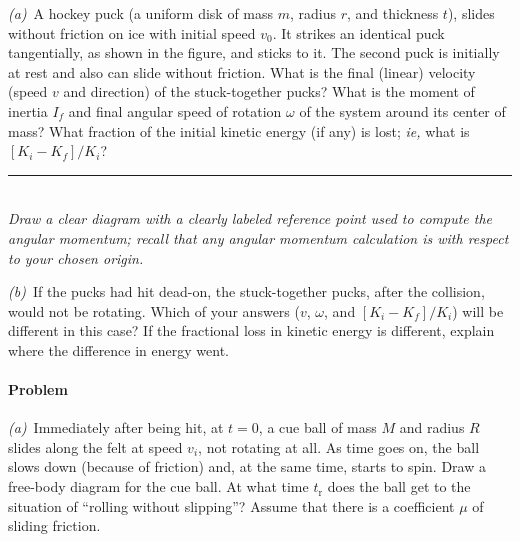 \documentclass[12pt]{article}
\newcounter{problem}
\begin{document}
\textsl{(a)}~A hockey puck (a uniform disk of mass $m$, radius $r$,
and thickness $t$), slides without friction on ice with initial speed
$v_0$.  It strikes an identical puck tangentially, as shown in the
figure, and sticks to it.  The second puck is initially at rest and
also can slide without friction.  What is the final (linear) velocity
(speed $v$ and direction) of the stuck-together pucks?  What is the
moment of inertia $I_f$ and final angular speed of rotation $\omega$
of the system around its center of mass?  What fraction of the initial
kinetic energy (if any) is lost; \textit{ie,} what is $[K_i-K_f]/K_i$?
\\ \rule{0.25\textwidth}{0pt}
\\

\emph{Draw a clear diagram with a clearly labeled reference point used
to compute the angular momentum; recall that any angular momentum
calculation is with respect to your chosen origin.}

\textsl{(b)}~If the pucks had hit dead-on, the stuck-together pucks,
after the collision, would not be rotating.  Which of your answers
($v$, $\omega$, and $[K_i-K_f]/K_i$) will be different in this case?
If the fractional loss in kinetic energy is different, explain where
the difference in energy went.


\paragraph{Problem~\theproblem}

\textsl{(a)}~Immediately after being hit, at $t=0$, a cue ball of mass
$M$ and radius $R$ slides along the felt at speed $v_i$, not rotating
at all.  As time goes on, the ball slows down (because of friction)
and, at the same time, starts to spin.  Draw a free-body diagram for
the cue ball.  At what time $t_\mathrm{r}$ does the ball get to the
situation of ``rolling without slipping''?  Assume that there is a
coefficient $\mu$ of sliding friction.
\end{document}
